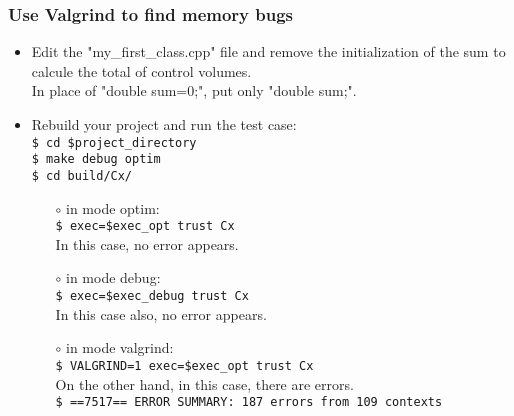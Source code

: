 \documentclass[10pt, hyperref={unicode=true,pdfusetitle, bookmarks=true,bookmarksnumbered=false,bookmarksopen=false, breaklinks=false,pdfborder={0 0 1},backref=true,colorlinks=true,linkcolor=darkblue,pageanchor, urlcolor=darkblue}]{beamer}
\begin{document}
\begin{frame}
\frametitle{Use Valgrind to find memory bugs}
\begin{itemize}
\item Edit the "my\_first\_class.cpp" file and remove the initialization of the sum to calcule the total of control volumes.\\
In place of "double sum=0;", put only "double sum;".\\
\item Rebuild your project and run the test case:\\
\texttt{\$ cd \$project\_directory}\\
\texttt{\$ make debug optim}\\
\texttt{\$ cd build/Cx/}\\
    \begin{itemize}
    \item [$\circ$] in mode optim:\\
    \texttt{\$ exec=\$exec\_opt trust Cx}\\
In this case, no error appears.
    \item [$\circ$] in mode debug:\\
    \texttt{\$ exec=\$exec\_debug trust Cx}\\
In this case also, no error appears.
    \item [$\circ$] in mode valgrind:\\
    \texttt{\$ VALGRIND=1 exec=\$exec\_opt trust Cx}\\
On the other hand, in this case, there are errors.\\
    \texttt{\$ ==7517== ERROR SUMMARY: 187 errors from 109 contexts}
    \end{itemize}
\end{itemize}
\end{frame}
\end{document}
